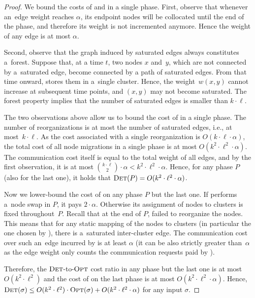 \begin{proof}
We bound the costs of \DET and \OPT in a single phase. First, observe that
whenever an~edge weight reaches $\alpha$, its endpoint nodes will be collocated 
until the end of the phase, and therefore its weight is not
incremented anymore. Hence the weight of any edge is at most $\alpha$.

Second, observe that the graph induced by saturated edges always constitutes 
a~forest. Suppose that, at a time $t$,
two nodes $x$ and~$y$, which are not
connected by a~saturated edge, become connected by a path of saturated edges.
From that time onward, \DET stores them in a~single cluster. Hence, the
weight~$w(x,y)$ cannot increase at subsequent time points, and $(x,y)$ may
not become saturated. The forest property implies that the number of saturated
edges is smaller than $k \cdot \ell$.

The two observations above allow us to bound the cost of \DET in a single
phase. The number of reorganizations is at most the number of saturated edges,
i.e., at most~$k \cdot \ell$. As the cost associated with a single
reorganization is $O(k \cdot \ell \cdot \alpha)$, the total cost of all node
migrations in a single phase is at most $O(k^2 \cdot \ell^2 \cdot \alpha)$.
The communication cost itself is equal to the total weight of all edges, and
by the first observation, it is at most $\binom{k \cdot \ell}{2}
\cdot \alpha < k^2 \cdot \ell^2 \cdot \alpha$. Hence, for any phase $P$ (also
for the last one), it holds that $\textsc{Det}(P) = O(k^2 \cdot \ell^2 \cdot \alpha)$.

Now we lower-bound the cost of \OPT on any phase $P$ but the last one. If \OPT
performs a~node swap in $P$, it pays $2 \cdot \alpha$. Otherwise its assignment of
nodes to clusters is fixed throughout~$P$. Recall that at the end of $P$, \DET
failed to reorganize the nodes. This means that for any static mapping of the
nodes to clusters (in particular the one chosen by \OPT), there is a~saturated inter-cluster edge. The communication cost over such an~edge incurred
by \OPT is at least $\alpha$ (it can be also strictly greater than~$\alpha$ as
the edge weight only counts the communication requests paid by \DET).

Therefore, the $\textsc{Det}$-to-$\textsc{Opt}$ cost ratio in any phase but the last one is at
most $O(k^2 \cdot \ell^2)$ and the cost of \DET on the last phase is at
most $O(k^2 \cdot \ell^2 \cdot \alpha)$. Hence,
$\textsc{Det}(\sigma) \leq O(k^2 \cdot \ell^2) \cdot \textsc{Opt}(\sigma) + O(k^2 \cdot
\ell^2 \cdot \alpha)$ for any input $\sigma$.
\end{proof}


